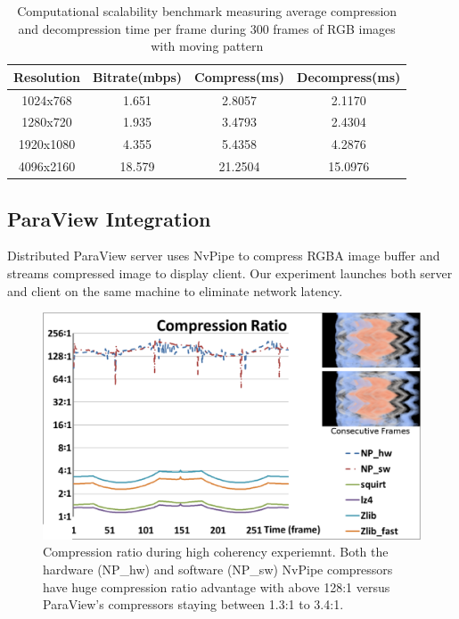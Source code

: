 \documentclass[review]{vgtc}                 %
\begin{document}
\begin{table}[h]
  \caption{Computational scalability benchmark measuring average compression and decompression time per frame during 300 frames of RGB images with moving pattern}
  \label{tab:experiment_setup}
  \scriptsize
  \begin{center}
    \begin{tabular}{cccc}
      Resolution & Bitrate(mbps) & Compress(ms) & Decompress(ms)\\
    \hline
      1024x768 & 1.651 & 2.8057 & 2.1170\\
      1280x720 & 1.935 & 3.4793 & 2.4304\\
      1920x1080 & 4.355 & 5.4358 & 4.2876\\
      4096x2160 & 18.579 & 21.2504 & 15.0976
    \end{tabular}
  \end{center}
\end{table}

\subsection{ParaView Integration}


Distributed ParaView server uses NvPipe to compress RGBA image buffer and streams compressed image to display client. Our experiment launches both server and client on the same machine to eliminate network latency. 


\begin{figure}[htb]
  \centering
  \includegraphics[width=\columnwidth]{compressRatio.eps}
  \caption{Compression ratio during high coherency experiemnt. Both the hardware (NP\_hw) and software (NP\_sw) NvPipe compressors have huge compression ratio advantage with above 128:1 versus ParaView's compressors staying between 1.3:1 to 3.4:1.}
  \label{fig:compressRatio}
\end{figure}
\end{document}
